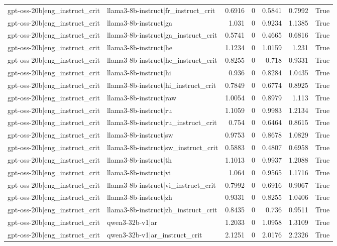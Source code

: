 \begin{table}
\begin{tabular}{l l r r r r l}
gpt-oss-20b|eng_instruct_crit & llama3-8b-instruct|fr_instruct_crit & 0.6916 & 0 & 0.5841 & 0.7992 & True \\
gpt-oss-20b|eng_instruct_crit & llama3-8b-instruct|ga & 1.031 & 0 & 0.9234 & 1.1385 & True \\
gpt-oss-20b|eng_instruct_crit & llama3-8b-instruct|ga_instruct_crit & 0.5741 & 0 & 0.4665 & 0.6816 & True \\
gpt-oss-20b|eng_instruct_crit & llama3-8b-instruct|he & 1.1234 & 0 & 1.0159 & 1.231 & True \\
gpt-oss-20b|eng_instruct_crit & llama3-8b-instruct|he_instruct_crit & 0.8255 & 0 & 0.718 & 0.9331 & True \\
gpt-oss-20b|eng_instruct_crit & llama3-8b-instruct|hi & 0.936 & 0 & 0.8284 & 1.0435 & True \\
gpt-oss-20b|eng_instruct_crit & llama3-8b-instruct|hi_instruct_crit & 0.7849 & 0 & 0.6774 & 0.8925 & True \\
gpt-oss-20b|eng_instruct_crit & llama3-8b-instruct|raw & 1.0054 & 0 & 0.8979 & 1.113 & True \\
gpt-oss-20b|eng_instruct_crit & llama3-8b-instruct|ru & 1.1059 & 0 & 0.9983 & 1.2134 & True \\
gpt-oss-20b|eng_instruct_crit & llama3-8b-instruct|ru_instruct_crit & 0.754 & 0 & 0.6464 & 0.8615 & True \\
gpt-oss-20b|eng_instruct_crit & llama3-8b-instruct|sw & 0.9753 & 0 & 0.8678 & 1.0829 & True \\
gpt-oss-20b|eng_instruct_crit & llama3-8b-instruct|sw_instruct_crit & 0.5883 & 0 & 0.4807 & 0.6958 & True \\
gpt-oss-20b|eng_instruct_crit & llama3-8b-instruct|th & 1.1013 & 0 & 0.9937 & 1.2088 & True \\
gpt-oss-20b|eng_instruct_crit & llama3-8b-instruct|vi & 1.064 & 0 & 0.9565 & 1.1716 & True \\
gpt-oss-20b|eng_instruct_crit & llama3-8b-instruct|vi_instruct_crit & 0.7992 & 0 & 0.6916 & 0.9067 & True \\
gpt-oss-20b|eng_instruct_crit & llama3-8b-instruct|zh & 0.9331 & 0 & 0.8255 & 1.0406 & True \\
gpt-oss-20b|eng_instruct_crit & llama3-8b-instruct|zh_instruct_crit & 0.8435 & 0 & 0.736 & 0.9511 & True \\
gpt-oss-20b|eng_instruct_crit & qwen3-32b-v1|ar & 1.2033 & 0 & 1.0958 & 1.3109 & True \\
gpt-oss-20b|eng_instruct_crit & qwen3-32b-v1|ar_instruct_crit & 2.1251 & 0 & 2.0176 & 2.2326 & True \\

\end{tabular}
\end{table}
